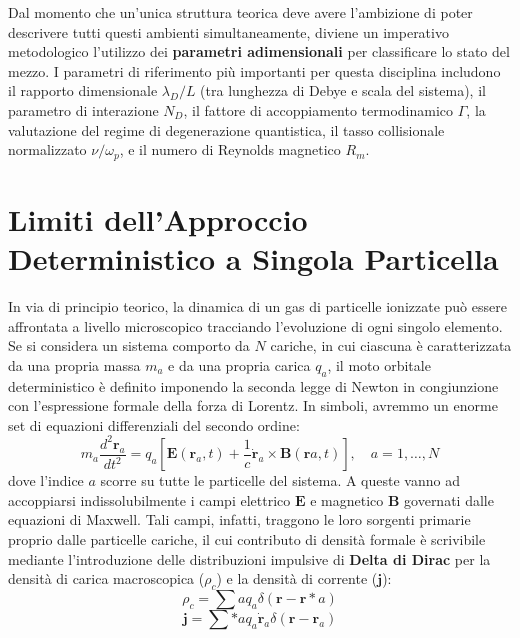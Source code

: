 Dal momento che un'unica struttura teorica deve avere l'ambizione di poter descrivere tutti questi ambienti simultaneamente, diviene un imperativo metodologico l'utilizzo dei \textbf{parametri adimensionali} per classificare lo stato del mezzo. I parametri di riferimento più importanti per questa disciplina includono il rapporto dimensionale $\lambda_D/L$ (tra lunghezza di Debye e scala del sistema), il parametro di interazione $N_D$, il fattore di accoppiamento termodinamico $\Gamma$, la valutazione del regime di degenerazione quantistica, il tasso collisionale normalizzato $\nu/\omega_p$, e il numero di Reynolds magnetico $R_m$.

\section{Limiti dell'Approccio Deterministico a Singola Particella}

In via di principio teorico, la dinamica di un gas di particelle ionizzate può essere affrontata a livello microscopico tracciando l'evoluzione di ogni singolo elemento. Se si considera un sistema comporto da $N$ cariche, in cui ciascuna è caratterizzata da una propria massa $m_a$ e da una propria carica $q_a$, il moto orbitale deterministico è definito imponendo la seconda legge di Newton in congiunzione con l'espressione formale della forza di Lorentz. In simboli, avremmo un enorme set di equazioni differenziali del secondo ordine:
\begin{equation}
m_a \frac{d^2 \mathbf{r}_a}{dt^2} = q_a \left[ \mathbf{E}(\mathbf{r}_a, t) + \frac{1}{c} \dot{\mathbf{r}}_a \times \mathbf{B}(\mathbf{r}a, t) \right], \quad a = 1, \dots, N
\end{equation}
dove l'indice $a$ scorre su tutte le particelle del sistema. A queste vanno ad accoppiarsi indissolubilmente i campi elettrico $\mathbf{E}$ e magnetico $\mathbf{B}$ governati dalle equazioni di Maxwell. Tali campi, infatti, traggono le loro sorgenti primarie proprio dalle particelle cariche, il cui contributo di densità formale è scrivibile mediante l'introduzione delle distribuzioni impulsive di \textbf{Delta di Dirac} per la densità di carica macroscopica ($\rho_c$) e la densità di corrente ($\mathbf{j}$):
\begin{equation}
\rho_c = \sum{a} q_a \delta(\mathbf{r} - \mathbf{r}*a)
\end{equation}
\begin{equation}
\mathbf{j} = \sum*{a} q_a \dot{\mathbf{r}}_a \delta(\mathbf{r} - \mathbf{r}_a)
\end{equation}

